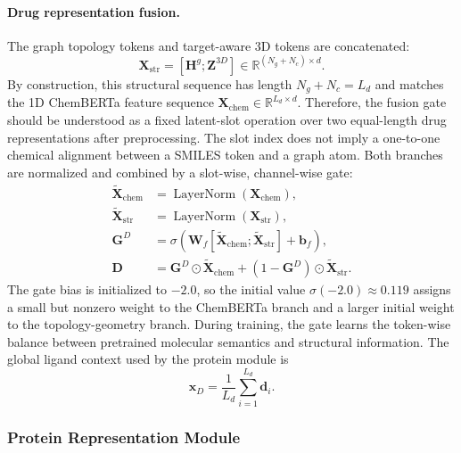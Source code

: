 \paragraph{Drug representation fusion.}
The graph topology tokens and target-aware 3D tokens are concatenated:
\begin{equation}
  \mathbf{X}_{\mathrm{str}} =
  [\mathbf{H}^{g};\mathbf{Z}^{3D}]
  \in\mathbb{R}^{(N_g+N_c)\times d}.
  \label{eq:geo_concat}
\end{equation}
By construction, this structural sequence has length
$N_g+N_c=L_d$ and matches the 1D ChemBERTa feature sequence
$\mathbf{X}_{\mathrm{chem}}\in\mathbb{R}^{L_d\times d}$. Therefore, the fusion
gate should be understood as a fixed latent-slot operation over two equal-length
drug representations after preprocessing. The slot index does not imply a
one-to-one chemical alignment between a SMILES token and a graph atom. Both
branches are normalized and combined by a slot-wise, channel-wise gate:
\begin{equation}
\begin{aligned}
  \tilde{\mathbf{X}}_{\mathrm{chem}}
  &= \operatorname{LayerNorm}(\mathbf{X}_{\mathrm{chem}}),\\
  \tilde{\mathbf{X}}_{\mathrm{str}}
  &= \operatorname{LayerNorm}(\mathbf{X}_{\mathrm{str}}),\\
  \mathbf{G}^{D}
  &= \sigma\!\left(
      \mathbf{W}_{f}
      [\tilde{\mathbf{X}}_{\mathrm{chem}};\tilde{\mathbf{X}}_{\mathrm{str}}]
      +\mathbf{b}_{f}
    \right),\\
  \mathbf{D}
  &= \mathbf{G}^{D}\odot\tilde{\mathbf{X}}_{\mathrm{chem}}
   + (1-\mathbf{G}^{D})\odot\tilde{\mathbf{X}}_{\mathrm{str}}.
\end{aligned}
\label{eq:drug_gate}
\end{equation}
The gate bias is initialized to $-2.0$, so the initial value
$\sigma(-2.0)\approx0.119$ assigns a small but nonzero weight to the ChemBERTa
branch and a larger initial weight to the topology-geometry branch. During
training, the gate learns the token-wise balance between pretrained molecular
semantics and structural information. The global ligand context used by the
protein module is
\begin{equation}
  \mathbf{x}_D = \frac{1}{L_d}\sum_{i=1}^{L_d}\mathbf{d}_i.
  \label{eq:drug_context}
\end{equation}

\subsubsection{Protein Representation Module}
\label{sec:protein_representation_module}

